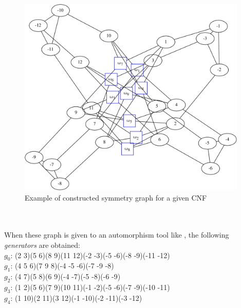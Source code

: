 \begin{figure}[h]
	\begin{minipage}[c]{.2\textwidth}
		
	\end{minipage}
	\begin{minipage}[l]{.75\textwidth}
		\includegraphics[width=4.3in]{cnfs/graph_cnf_opt-crop}
	\end{minipage}
	\caption{Example of constructed symmetry graph for a given CNF}
\end{figure}


\\
\\

When these graph is given to an automorphism tool like \bliss, the following \emph{generators} are 
obtained:\\
$g_0$: (2 3)(5 6)(8 9)(11 12)(-2 -3)(-5 -6)(-8 -9)(-11 -12)\\
$g_1$: (4 5 6)(7 9 8)(-4 -5 -6)(-7 -9 -8)\\
$g_2$: (4 7)(5 8)(6 9)(-4 -7)(-5 -8)(-6 -9)\\
$g_3$: (1 2)(5 6)(7 9)(10 11)(-1 -2)(-5 -6)(-7 -9)(-10 -11)\\
$g_4$: (1 10)(2 11)(3 12)(-1 -10)(-2 -11)(-3 -12)\\

 
 
